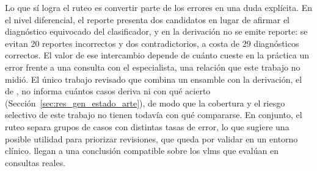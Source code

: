 Lo que sí logra el ruteo es convertir parte de los errores en una duda explícita. En el nivel diferencial, el reporte
presenta dos candidatos en lugar de afirmar el diagnóstico equivocado del clasificador, y en la derivación no se emite
reporte: se evitan 20 reportes incorrectos y dos contradictorios, a costa de 29 diagnósticos correctos. El valor de ese
intercambio depende de cuánto cueste en la práctica un error frente a una consulta con el especialista, una relación
que este trabajo no midió. El único trabajo revisado que combina un ensamble con la derivación,
el de \textcite{khan2025ensemble}, no informa cuántos casos deriva ni con qué acierto (Sección~\ref{sec:res_gen_estado_arte}),
de modo que la cobertura y el riesgo selectivo de este trabajo no tienen todavía con qué compararse. En conjunto, el ruteo separa grupos de casos con distintas tasas de error, lo que sugiere una posible utilidad para
priorizar revisiones, que queda por validar en un entorno clínico. \textcite{jiang2026multimodal} llegan a una conclusión
compatible sobre los \glspl{vlm} que evalúan en consultas reales.
